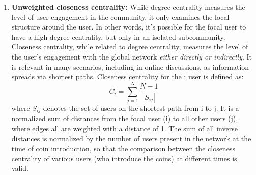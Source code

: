 \begin{enumerate}[topsep=0pt,itemsep=-0.5ex,partopsep=1ex,parsep=1ex]
  \item \textbf{Unweighted closeness centrality:} While degree centrality measures the level of user engagement in the community, it only examines the local structure around the user. In other words, it's possible for the focal user to have a high degree centrality, but only in an isolated subcommunity. Closeness centrality, while related to degree centrality, measures the level of the user's engagement with the global network \textit{either directly or indirectly}. It is relevant in many scenarios, including in online discussions, as information spreads via shortest paths. Closeness centrality for the i user is defined as:
  \begin{equation}
    C_{i} = \sum_{j=1}^{N} \frac{N-1}{|S_{ij}|}
  \end{equation}
  where $S_{ij}$ denotes the set of users on the shortest path from i to j. It is a normalized sum of distances from the focal user (i) to all other users (j), where edges all are weighted with a distance of 1. The sum of all inverse distances is normalized by the number of users present in the network at the time of coin introduction, so that the comparison between the closeness centrality of various users (who introduce the coins) at different times  is valid. 
  

\end{enumerate}
